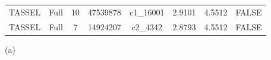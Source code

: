 \documentclass{article}
\begin{document}
\begin{figure}[H]
{{\begin{minipage}[t][1\totalheight][b]{0.46\columnwidth}
\begin{center}
\begin{tabular}{cccccccc}
TASSEL & Full & 10 & 47539878 & c1\_16001 & 2.9101 & 4.5512 & FALSE\tabularnewline
TASSEL & Full & 7 & 14924207 & c2\_4342 & 2.8793 & 4.5512 & FALSE\tabularnewline
\hline 
\end{tabular}
\par\end{center}
\begin{center}
\normalsize (a)
\par\end{center}%
\end{minipage}}}~~~~~~~~~~~%
\noindent\begin{minipage}[t]{1\columnwidth}%
{\fboxrule 0.2pt\fboxsep 2pt}


\end{minipage}
\end{figure}
\end{document}
